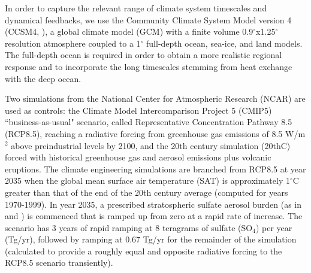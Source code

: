 \documentclass{nature}
\begin{document}
\begin{methods}

In order to capture the relevant range of climate system timescales and dynamical feedbacks, we use the Community Climate System Model version 4 (CCSM4, \cite{gent11}), a global climate model (GCM) with a finite volume 0.9$^\circ$x1.25$^\circ$ resolution atmosphere coupled to a 1$^\circ$ full-depth ocean, sea-ice, and land models. The full-depth ocean is required in order to obtain a more realistic regional response \cite{mccusker12} and to incorporate the long timescales stemming from heat exchange with the deep ocean. %

Two simulations from the National Center for Atmospheric Research (NCAR) are used as controls: the Climate Model Intercomparison Project 5 (CMIP5) ``business-as-usual" scenario, called Representative Concentration Pathway 8.5 (RCP8.5), reaching a radiative forcing from greenhouse gas emissions of 8.5 W/m$^{2}$ above preindustrial levels by 2100, and the 20th century simulation (20thC) forced with historical greenhouse gas and aerosol emissions plus volcanic eruptions. The climate engineering simulations are branched from RCP8.5 at year 2035 when the global mean surface air temperature (SAT) is approximately 1$^\circ$C greater than that of the end of the 20th century average (computed for years 1970-1999). In year 2035, a prescribed stratospheric sulfate aerosol burden (as in \cite{mccusker12} and \cite{mccusker14}) is commenced that is ramped up from zero at a rapid rate of increase. The scenario has 3 years of rapid ramping at 8 teragrams of sulfate (SO$_4$) per year (Tg/yr), followed by ramping at 0.67 Tg/yr for the remainder of the simulation (calculated to provide a roughly equal and opposite radiative forcing to the RCP8.5 scenario transiently). %


\end{methods}
\end{document}
